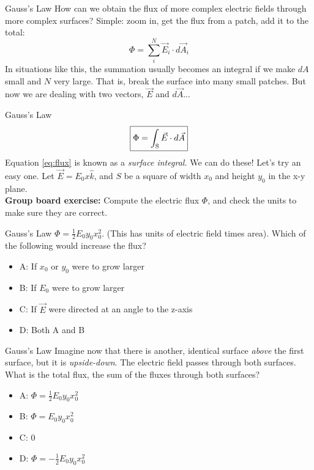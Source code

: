 \documentclass{beamer}
\begin{document}
\begin{frame}{Gauss's Law}
How can we obtain the flux of more complex electric fields through more complex surfaces?  Simple: zoom in, get the flux from a patch, add it to the total:
\begin{equation}
\Phi = \sum_i^N \vec{E}_i \cdot d\vec{A}_i
\end{equation}
In situations like this, the summation usually becomes an integral if we make $dA$ small and $N$ very large.  That is, break the surface into many small patches.  But now we are dealing with two vectors, $\vec{E}$ and $d\vec{A}$...
\end{frame}

\begin{frame}{Gauss's Law}
\begin{equation}
\boxed{
\Phi = \int_{\rm S} \vec{E} \cdot d\vec{A}} \label{eq:flux}
\end{equation}
Equation \ref{eq:flux} is known as a \textit{surface integral.}  We can do these!  Let's try an easy one.  Let $\vec{E} = E_0 x \hat{k}$, and $S$ be a square of width $x_0$ and height $y_0$ in the x-y plane. \\ \vspace{0.5cm}
\textbf{Group board exercise:} Compute the electric flux $\Phi$, and check the units to make sure they are correct.
\end{frame}

\begin{frame}{Gauss's Law}
$\Phi = \frac{1}{2} E_0 y_0 x_0^2$.  (This has units of electric field times area).  Which of the following would increase the flux?
\begin{itemize}
\item A: If $x_0$ or $y_0$ were to grow larger
\item B: If $E_0$ were to grow larger
\item C: If $\vec{E}$ were directed at an angle to the z-axis
\item D: Both A and B
\end{itemize}
\end{frame}

\begin{frame}{Gauss's Law}
Imagine now that there is another, identical surface \textit{above} the first surface, but it is \textit{upside-down}.  The electric field passes through both surfaces.  What is the total flux, the sum of the fluxes through both surfaces?
\begin{itemize}
\item A: $\Phi = \frac{1}{2} E_0 y_0 x_0^2$
\item B: $\Phi = E_0 y_0 x_0^2$
\item C: $0$
\item D: $\Phi = -\frac{1}{2} E_0 y_0 x_0^2$
\end{itemize}
\end{frame}
\end{document}
